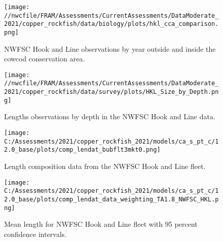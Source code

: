 \documentclass[11pt,
  english,
  a4paper,
]{article}
\begin{document}
\tagmcend\tagstructend


\begin{figure}
\centering
\texttt{[image: //nwcfile/FRAM/Assessments/CurrentAssessments/DataModerate\_2021/copper\_rockfish/data/biology/plots/hkl\_cca\_comparison.png]}
\caption{NWFSC Hook and Line observations by year outside and inside the cowcod conservation area.\label{fig:hkl-cca}}
\end{figure}

\tagmcend\tagstructend


\begin{figure}
\centering
\texttt{[image: //nwcfile/FRAM/Assessments/CurrentAssessments/DataModerate\_2021/copper\_rockfish/data/survey/plots/HKL\_Size\_by\_Depth.png]}
\caption{Lengths observations by depth in the NWFSC Hook and Line data.\label{fig:hkl-len-dep}}
\end{figure}

\tagmcend\tagstructend


\begin{figure}
\centering
\texttt{[image: C:/Assessments/2021/copper\_rockfish\_2021/models/ca\_s\_pt\_c/12.0\_base/plots/comp\_lendat\_bubflt3mkt0.png]}
\caption{Length composition data from the NWFSC Hook and Line fleet.\label{fig:hkl-len-data}}
\end{figure}

\tagmcend\tagstructend


\begin{figure}
\centering
\texttt{[image: C:/Assessments/2021/copper\_rockfish\_2021/models/ca\_s\_pt\_c/12.0\_base/plots/comp\_lendat\_data\_weighting\_TA1.8\_NWFSC\_HKL.png]}
\caption{Mean length for NWFSC Hook and Line fleet with 95 percent confidence intervals.\label{fig:mean-hkl-len-data}}
\end{figure}
\end{document}
